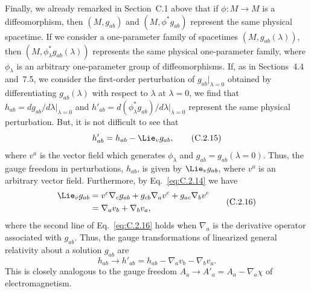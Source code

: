 Finally, we already remarked in Section~C.1 above that if \(\phi:M\to M\) is a
diffeomorphism, then \((M,g_{ab})\) and \((M,\phi^*g_{ab})\) represent the same
physical spacetime. If we consider a one-parameter family of spacetimes
\((M,g_{ab}(\lambda))\), then \((M,\phi_\lambda^*g_{ab}(\lambda))\) represents the
same physical one-parameter family, where \(\phi_\lambda\) is an arbitrary
one-parameter group of diffeomorphisms. If, as in Sections~4.4 and~7.5, we consider
the first-order perturbation of \(g_{ab}\big\rvert_{\lambda=0}\) obtained by
differentiating \(g_{ab}(\lambda)\) with respect to \(\lambda\) at \(\lambda=0\), we
find that
\(h_{ab}=dg_{ab}/d\lambda\big\rvert_{\lambda=0}\) and
\(h'_{ab}=d(\phi_\lambda^*g_{ab})/d\lambda\big\rvert_{\lambda=0}\) represent the
same physical perturbation. But, it is not difficult to see that
\begin{equation}
  h'_{ab}=h_{ab}-\Lie_vg_{ab},
  \tag{C.2.15}\label{eq:C.2.15}
\end{equation}
where \(v^a\) is the vector field which generates \(\phi_\lambda\) and
\(g_{ab}=g_{ab}(\lambda=0)\). Thus, the gauge freedom in perturbations, \(h_{ab}\),
is given by \(\Lie_vg_{ab}\), where \(v^a\) is an arbitrary vector field.
Furthermore, by Eq.~\eqref{eq:C.2.14} we have
\begin{equation}
\begin{aligned}
  \Lie_vg_{ab}
  &=v^c\nabla_cg_{ab}+g_{cb}\nabla_av^c+g_{ac}\nabla_bv^c\\
  &=\nabla_av_b+\nabla_bv_a,
\end{aligned}
  \tag{C.2.16}\label{eq:C.2.16}
\end{equation}
where the second line of Eq.~\eqref{eq:C.2.16} holds when \(\nabla_a\) is the
derivative operator associated with \(g_{ab}\). Thus, the gauge transformations of
linearized general relativity about a solution \(g_{ab}\) are
\begin{equation}
  h_{ab}\longrightarrow h'_{ab}
  =h_{ab}-\nabla_av_b-\nabla_bv_a.
  \tag{C.2.17}\label{eq:C.2.17}
\end{equation}
This is closely analogous to the gauge freedom
\(A_a\longrightarrow A'_a=A_a-\nabla_a\chi\) of electromagnetism.
